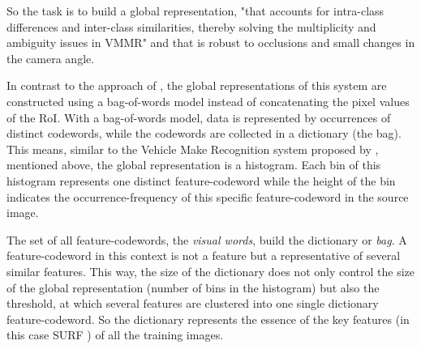 So the task is to build a global representation, "that accounts for intra-class differences and inter-class similarities, thereby solving the multiplicity and ambiguity issues in VMMR" \citep{siddiqui2015robust} and that is robust to occlusions and small changes in the camera angle.

In contrast to the approach of \citeauthor{petrovic2004analysis}, the global representations of this system are constructed using a bag-of-words model instead of concatenating the pixel values of the RoI. With a bag-of-words model, data is represented by occurrences of distinct codewords, while the codewords are collected in a dictionary (the bag). This means, similar to the Vehicle Make Recognition system proposed by \citep{yu2013vehicle}, mentioned above, the global representation is a histogram. Each bin of this histogram represents one distinct feature-codeword while the height of the bin indicates the occurrence-frequency of this specific feature-codeword in the source image.

The set of all feature-codewords, the \emph{visual words}, build the dictionary or \emph{bag}. A feature-codeword in this context is not a feature but a representative of several similar features. This way, the size of the dictionary does not only control the size of the global representation (number of bins in the histogram) but also the threshold, at which several features are clustered into one single dictionary feature-codeword. So the dictionary represents the essence of the key features (in this case SURF \citep{bay2008speeded}) of all the training images.

